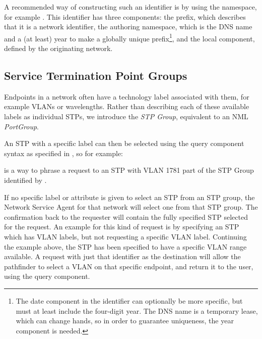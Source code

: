 \documentclass[12pt]{article}  %
\begin{document}
A recommended way of constructing such an identifier is by using 
the  namespace\cite{GFD.202}, for example .
This identifier has three components: the prefix,  
which describes that it is a network identifier, the authoring namespace,  
which is the DNS name and a (at least) year to make a globally unique prefix\footnote{  
The date component in the identifier can optionally be more specific, but must at least include the four-digit year. The DNS name is a temporary lease, which can change hands, so in order to guarantee uniqueness, the year component is needed.}, and the local component,  defined by the originating 
network.

\subsection{Service Termination Point Groups}

Endpoints in a network often have a technology label associated 
with them, for example VLANs or wavelengths. Rather than describing each of these 
available labels as individual STPs, we introduce the \emph{STP Group}, equivalent to 
an NML \emph{PortGroup}.

An STP with a specific label can then be selected using the query 
component syntax as specified in \cite{rfc3986}, so for example:

 is a way to phrase 
a request to an STP with VLAN 1781 part of the STP Group identified by 
.


If no specific label or attribute is given to select an STP from 
an STP group, the Network Service Agent for that network will select one from that STP group. The 
confirmation back to the requester will contain the fully specified STP selected 
for the request. An example for this kind of request is by specifying an STP which 
has VLAN labels, but not requesting a specific VLAN label. Continuing the example 
above, the STP  has been specified to have a 
specific VLAN range available. A request with just that identifier as the destination 
will allow the pathfinder to select a VLAN on that specific endpoint, and return 
it to the user, using the query component.

% 
\end{document}
